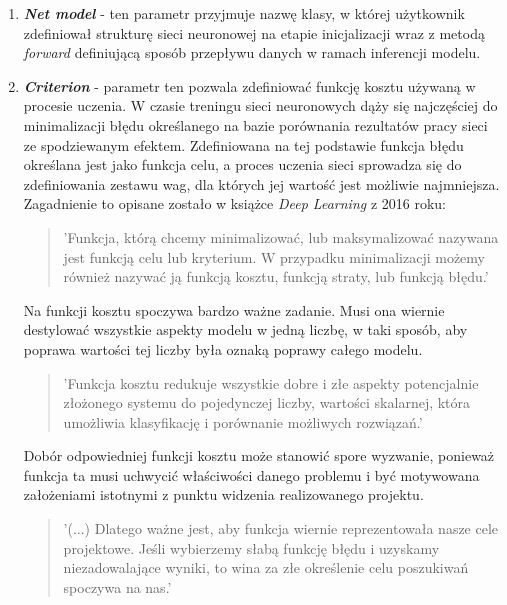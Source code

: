     \begin{enumerate}
    \item \textbf{\textit{Net model}} - ten parametr przyjmuje nazwę klasy, w której użytkownik
    zdefiniował strukturę sieci neuronowej na etapie inicjalizacji wraz z metodą
    \textit{forward} definiującą sposób przepływu danych w ramach inferencji modelu.
    \item \textbf{\textit{Criterion}} - parametr ten pozwala zdefiniować funkcję kosztu
    używaną w procesie uczenia. W czasie treningu sieci neuronowych dąży się
    najczęściej do minimalizacji błędu określanego na bazie porównania rezultatów
    pracy sieci ze spodziewanym efektem. Zdefiniowana na tej podstawie funkcja błędu
    określana jest jako funkcja celu, a proces uczenia sieci sprowadza się do zdefiniowania
    zestawu wag, dla których jej wartość jest możliwie najmniejsza. Zagadnienie
    to opisane zostało w książce \textit{Deep Learning} \cite{deeplearn} z 2016 roku:

    \begin{quote}
      'Funkcja, którą chcemy minimalizować, lub maksymalizować nazywana jest funkcją celu lub kryterium.
      W przypadku minimalizacji możemy również nazywać ją funkcją kosztu, funkcją straty, lub funkcją błędu.'
    \end{quote}

    Na funkcji kosztu spoczywa bardzo ważne zadanie. Musi ona wiernie destylować wszystkie
    aspekty modelu w jedną liczbę, w taki sposób, aby poprawa wartości tej liczby była
    oznaką poprawy całego modelu. \cite{neuralsmithing}

    \begin{quote}
      'Funkcja kosztu redukuje wszystkie dobre i złe aspekty potencjalnie złożonego
      systemu do pojedynczej liczby, wartości skalarnej, która umożliwia
      klasyfikację i porównanie możliwych rozwiązań.'
    \end{quote}

    Dobór odpowiedniej funkcji kosztu może stanowić spore wyzwanie, ponieważ funkcja
    ta musi uchwycić właściwości danego problemu i być motywowana założeniami
    istotnymi z punktu widzenia realizowanego projektu. \cite{neuralsmithing}

    \begin{quote}
      '(...) Dlatego ważne jest, aby funkcja wiernie reprezentowała nasze cele projektowe.
      Jeśli wybierzemy słabą funkcję błędu i uzyskamy niezadowalające wyniki, to
      wina za złe określenie celu poszukiwań spoczywa na nas.'
    \end{quote}


\end{enumerate}
